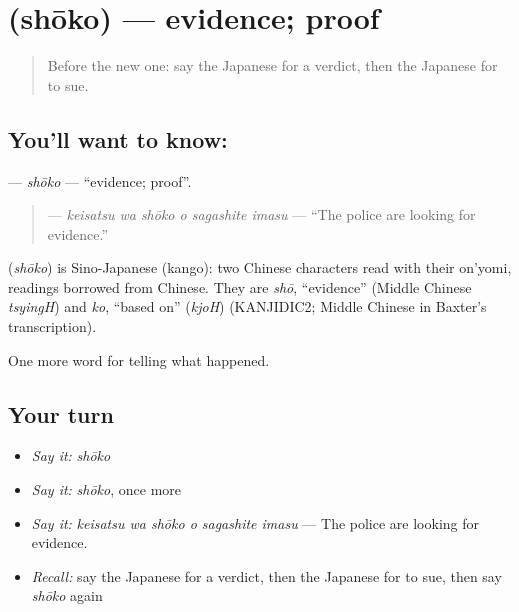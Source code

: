 \section[\texorpdfstring{\ja{しょうこ} (shōko)}{しょうこ (shōko)}]{ (shōko) — evidence; proof}

\label{lesson:JA-C273-shouko}



\begin{quote}
Before the new one: say the Japanese for a verdict, then the Japanese for to sue.
\end{quote}

\subsection*{You'll want to know: }
\textbf{} — \emph{shōko} — \textquotedblleft{}evidence; proof\textquotedblright{}.

\begin{quote}
\textbf{  } — \emph{keisatsu wa shōko o sagashite imasu} — \textquotedblleft{}The police are looking for evidence.\textquotedblright{}
\end{quote}

\begin{cousinweb}
\textbf{} (\emph{shōko}) is Sino-Japanese (kango): two Chinese characters read with their on'yomi, readings borrowed from Chinese. They are \emph{shō}, \textquotedblleft{}evidence\textquotedblright{} (Middle Chinese \emph{tsyingH}) and \emph{ko}, \textquotedblleft{}based on\textquotedblright{} (\emph{kjoH}) (KANJIDIC2; Middle Chinese in Baxter's transcription).
\end{cousinweb}

\begin{grammarlens}[title={What you've built}]
One more word for telling what happened.
\end{grammarlens}

\subsection*{Your turn}
\begin{itemize}
\raggedright
  \item \emph{Say it:} \emph{shōko}
  \item \emph{Say it:} \emph{shōko}, once more
  \item \emph{Say it:} \emph{keisatsu wa shōko o sagashite imasu} — The police are looking for evidence.
  \item \emph{Recall:} say the Japanese for a verdict, then the Japanese for to sue, then say \emph{shōko} again
\end{itemize}


